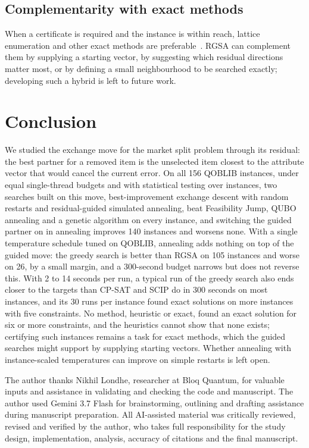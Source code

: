 \documentclass[pdflatex,sn-mathphys-num]{sn-jnl}
\theoremstyle{thmstyleone}
\theoremstyle{thmstylethree}
\begin{document}
\subsection{Complementarity with exact methods}
When a certificate is required and the instance is within reach, lattice enumeration and other exact methods are preferable~\cite{wassermann2026,kempkekoch2026}. RGSA can complement them by supplying a starting vector, by suggesting which residual directions matter most, or by defining a small neighbourhood to be searched exactly; developing such a hybrid is left to future work.

\section{Conclusion}\label{sec:conclusion}
We studied the exchange move for the market split problem through its residual: the best partner for a removed item is the unselected item closest to the attribute vector that would cancel the current error. On all 156 QOBLIB instances, under equal single-thread budgets and with statistical testing over instances, two searches built on this move, best-improvement exchange descent with random restarts and residual-guided simulated annealing, beat Feasibility Jump, QUBO annealing and a genetic algorithm on every instance, and switching the guided partner on in annealing improves 140 instances and worsens none. With a single temperature schedule tuned on QOBLIB, annealing adds nothing on top of the guided move: the greedy search is better than RGSA on 105 instances and worse on 26, by a small margin, and a 300-second budget narrows but does not reverse this. With 2 to 14 seconds per run, a typical run of the greedy search also ends closer to the targets than CP-SAT and SCIP do in 300 seconds on most instances, and its 30 runs per instance found exact solutions on more instances with five constraints. No method, heuristic or exact, found an exact solution for six or more constraints, and the heuristics cannot show that none exists; certifying such instances remains a task for exact methods, which the guided searches might support by supplying starting vectors. Whether annealing with instance-scaled temperatures can improve on simple restarts is left open.

\backmatter

The author thanks Nikhil Londhe, researcher at Bloq Quantum, for valuable inputs and assistance in validating and checking the code and manuscript. The author used Gemini 3.7 Flash for brainstorming, outlining and drafting assistance during manuscript preparation. All AI-assisted material was critically reviewed, revised and verified by the author, who takes full responsibility for the study design, implementation, analysis, accuracy of citations and the final manuscript.
\end{document}
